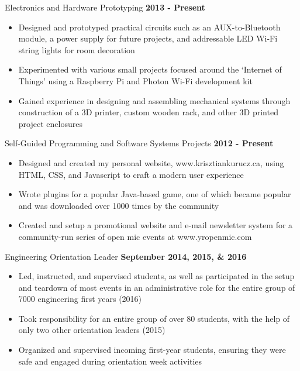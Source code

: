 \documentclass[hidelinks]{kkurucz-cv}
\begin{document}
\begin{entrylist}
\entry
{\vspace{-8mm}\null}
{Electronics and Hardware Prototyping}
{\textbf{2013 - Present}}
{
\vspace{-4mm}
\begin{itemize}
	\item Designed and prototyped practical circuits such as an AUX-to-Bluetooth module, a power supply for future projects, and addressable LED Wi-Fi string lights for room decoration
	\item Experimented with various small projects focused around the ‘Internet of Things’ using a Raspberry Pi and Photon Wi-Fi development kit
	\item Gained experience in designing and assembling mechanical systems through construction of a 3D printer, custom wooden rack, and other 3D printed project enclosures
\end{itemize}
}
{\null}
\entry
{\vspace{-8mm}\null}
{Self-Guided Programming and Software Systems Projects}
{\textbf{2012 - Present}}
{
\vspace{-4mm}
\begin{itemize}
	\item Designed and created my personal website, www.krisztiankurucz.ca, using HTML, CSS, and Javascript to craft a modern user experience
	\item Wrote plugins for a popular Java-based game, one of which became popular and was downloaded over 1000 times by the community
	\item Created and setup a promotional website and e-mail newsletter system for a community-run series of open mic events at www.yropenmic.com
\end{itemize}
}
{\null}
\entry
{\vspace{-8mm}\null}
{Engineering Orientation Leader}
{\textbf{September 2014, 2015, \& 2016}}
{
\vspace{-4mm}
\begin{itemize}
	\item Led, instructed, and supervised students, as well as participated in the setup and teardown of most events in an administrative role for the entire group of 7000 engineering first years (2016)
	\item Took responsibility for an entire group of over 80 students, with the help of only two other orientation leaders (2015)
	\item Organized and supervised incoming first-year students, ensuring they were safe and engaged during orientation week activities
	\end{itemize}
}
{\null}
\end{entrylist}
\end{document}
